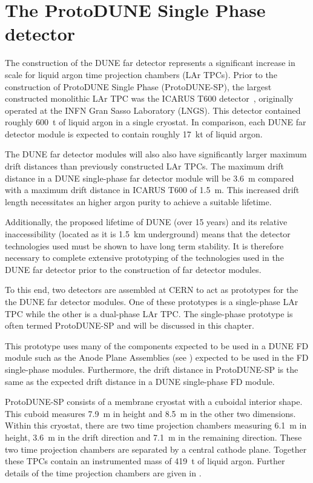 \chapter{The ProtoDUNE Single Phase detector}
\label{sec:protodune}

The construction of the DUNE far detector represents a significant increase in scale for liquid argon time projection chambers (LAr TPCs).
Prior to the construction of ProtoDUNE Single Phase (ProtoDUNE-SP), the largest constructed monolithic LAr TPC was the ICARUS T600 detector~\cite{icarus}, originally operated at the INFN Gran Sasso Laboratory (LNGS).
This detector contained roughly \SI{600}{\tonne} of liquid argon in a single cryostat.
In comparison, each DUNE far detector module is expected to contain roughly \SI{17}{\kilo\tonne} of liquid argon.

The DUNE far detector modules will also also have significantly larger maximum drift distances than previously constructed LAr TPCs.
The maximum drift distance in a DUNE single-phase far detector module will be \SI{3.6}{\m} compared with a maximum drift distance in ICARUS T600 of \SI{1.5}{\m}.
This increased drift length necessitates an higher argon purity to achieve a suitable lifetime.

Additionally, the proposed lifetime of DUNE (over 15 years) and its relative inaccessibility (located as it is \SI{1.5}{\kilo\metre} underground) means that the detector technologies used must be shown to have long term stability.
It is therefore necessary to complete extensive prototyping of the technologies used in the DUNE far detector prior to the construction of far detector modules.

To this end, two detectors are assembled at CERN to act as prototypes for the the DUNE far detector modules.
One of these prototypes is a single-phase LAr TPC while the other is a dual-phase LAr TPC.
The single-phase prototype is often termed ProtoDUNE-SP and will be discussed in this chapter.

This prototype uses many of the components expected to be used in a DUNE FD module such as the Anode Plane Assemblies (see ) expected to be used in the FD single-phase modules.
Furthermore, the drift distance in ProtoDUNE-SP is the same as the expected drift distance in a DUNE single-phase FD module.

ProtoDUNE-SP consists of a membrane cryostat with a cuboidal interior shape.
This cuboid measures \SI{7.9}{\m} in height and \SI{8.5}{\m} in the other two dimensions.
Within this cryostat, there are two time projection chambers measuring \SI{6.1}{\m} in height, \SI{3.6}{\m} in the drift direction and \SI{7.1}{\m} in the remaining direction.
These two time projection chambers are separated by a central cathode plane.
Together these TPCs contain an instrumented mass of \SI{419}{\tonne} of liquid argon.
Further details of the time projection chambers are given in .

